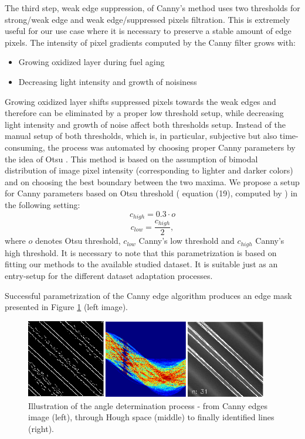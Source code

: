 \documentclass[preprint,12pt]{elsarticle}
\begin{document}
The third step, weak edge suppression, of Canny's method uses two thresholds for strong/weak edge and weak edge/suppressed pixels filtration. This is extremely useful for our use case where it is necessary to preserve a stable amount of edge pixels. The intensity of pixel gradients computed by the Canny filter grows with:
\begin{itemize}
    \item{Growing oxidized layer during fuel aging}
    \item{Decreasing light intensity and growth of noisiness}
\end{itemize}
Growing oxidized layer shifts suppressed pixels towards the weak edges and therefore can be eliminated by a proper low threshold setup, while decreasing light intensity and growth of noise affect both thresholds setup. Instead of the manual setup of both thresholds, which is, in particular, subjective but also time-consuming, the process was automated by choosing proper Canny parameters by the idea of Otsu \cite{Otsu1979}. This method is based on the assumption of bimodal distribution of image pixel intensity  (corresponding to lighter and darker colors) and on choosing the best boundary between the two maxima. We propose a setup for Canny parameters based on Otsu threshold (\cite{Otsu1979} equation (19), computed by \cite{OpenCVOtsu}) in the following setting:
\begin{equation}
c_{high} = 0.3 \cdot o    
\end{equation}
\begin{equation}
c_{low} = \frac{c_{high}}{2},
\end{equation}
where $o$ denotes Otsu threshold, $c_{low}$ Canny's low threshold and $c_{high}$ Canny's high threshold. It is necessary to note that this parametrization is based on fitting our methods to the available studied dataset. It is suitable just as an entry-setup for the different dataset adaptation processes.

Successful parametrization of the Canny edge algorithm produces an edge mask presented in Figure \ref{fig:angle_process} (left image).

\begin{figure}[hptb]
    \centering
    \includegraphics[width=0.95\textwidth]{angle_process-1.png}
    \caption{Illustration of the angle determination process - from Canny edges image (left),
    through Hough space (middle) to finally identified lines (right).}
    \label{fig:angle_process}
\end{figure}
\end{document}
